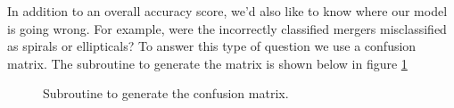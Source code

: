 In addition to an overall accuracy score, we'd also like to know where our model is going wrong. For example, were the incorrectly classified mergers misclassified as spirals or ellipticals? To answer this type of question we use a confusion matrix. The subroutine to generate the matrix is shown below in figure \ref{fig:cfc}
\begin{figure}[H]
	\centering
	\caption{Subroutine to generate the confusion matrix.}
	\label{fig:cfc}
\end{figure}

